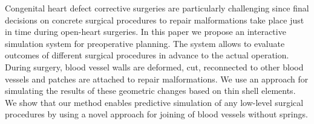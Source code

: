 
Congenital heart defect corrective surgeries are particularly challenging since final decisions on concrete surgical procedures to repair malformations take place just in time during open-heart surgeries. In this paper we propose an interactive simulation system for preoperative planning. The system allows to evaluate outcomes of different surgical procedures in advance to the actual operation. During surgery, blood vessel walls are deformed, cut, reconnected to other blood vessels and patches are attached to repair malformations. We use an approach for simulating the results of these geometric changes based on thin shell elements. We show that our method enables predictive simulation of any low-level surgical procedures by using a novel approach for joining of blood vessels without springs.